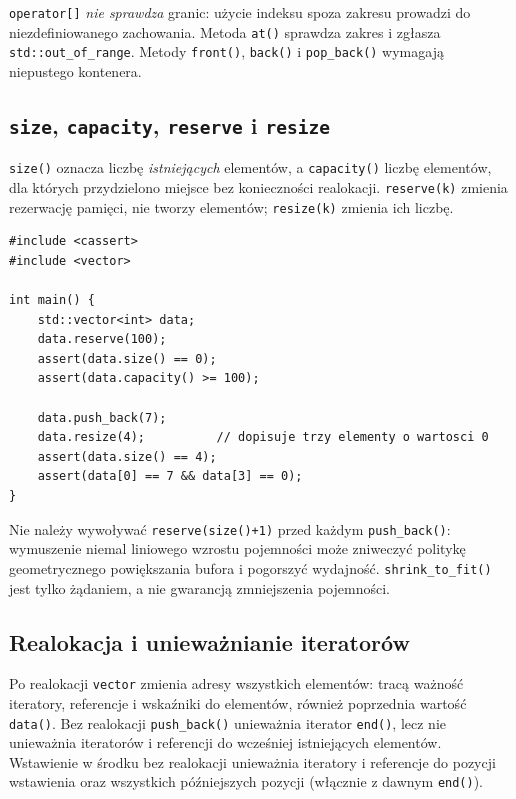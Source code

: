 \texttt{operator[]} \emph{nie sprawdza} granic: użycie indeksu spoza zakresu
prowadzi do niezdefiniowanego zachowania. Metoda \texttt{at()} sprawdza
zakres i zgłasza \texttt{std::out\_of\_range}. Metody \texttt{front()},
\texttt{back()} i \texttt{pop\_back()} wymagają niepustego kontenera.

\subsection{\texttt{size}, \texttt{capacity}, \texttt{reserve} i \texttt{resize}}

\texttt{size()} oznacza liczbę \emph{istniejących} elementów, a
\texttt{capacity()} liczbę elementów, dla których przydzielono miejsce
bez konieczności realokacji. \texttt{reserve(k)} zmienia rezerwację
pamięci, nie tworzy elementów; \texttt{resize(k)} zmienia ich liczbę.

\begin{lstlisting}[caption={Rezerwacja pamięci nie zwiększa rozmiaru (C++11); kompletny program.}]
#include <cassert>
#include <vector>

int main() {
    std::vector<int> data;
    data.reserve(100);
    assert(data.size() == 0);
    assert(data.capacity() >= 100);

    data.push_back(7);
    data.resize(4);          // dopisuje trzy elementy o wartosci 0
    assert(data.size() == 4);
    assert(data[0] == 7 && data[3] == 0);
}
\end{lstlisting}

Nie należy wywoływać \texttt{reserve(size()+1)} przed każdym
\texttt{push\_back()}: wymuszenie niemal liniowego wzrostu pojemności
może zniweczyć politykę geometrycznego powiększania bufora i pogorszyć
wydajność. \texttt{shrink\_to\_fit()} jest tylko żądaniem, a nie gwarancją
zmniejszenia pojemności.

\subsection{Realokacja i unieważnianie iteratorów}

Po realokacji \texttt{vector} zmienia adresy wszystkich elementów:
tracą ważność iteratory, referencje i wskaźniki do elementów, również
poprzednia wartość \texttt{data()}. Bez realokacji \texttt{push\_back()}
unieważnia iterator \texttt{end()}, lecz nie unieważnia iteratorów i
referencji do wcześniej istniejących elementów. Wstawienie w środku
bez realokacji unieważnia iteratory i referencje do pozycji wstawienia
oraz wszystkich późniejszych pozycji (włącznie z dawnym \texttt{end()}).

